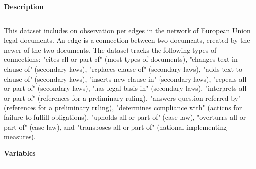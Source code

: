 \documentclass[10pt]{article}
\newcommand{\dividerline}{{\color{gray!10} \rule[4pt] {\textwidth}{3pt}}}
\newcommand{\subheading}[1]{
\vspace{24pt}
{\color{themecolor} \fontsize{14}{14}\selectfont \textbf{#1}}
\vspace{6pt}
\dividerline
\vspace{-20pt}
}
\begin{document}
\begin{flushleft}
\subheading{Description}

This dataset includes on observation per edges in the network of European Union legal documents. An edge is a connection between two documents, created by the newer of the two documents. The dataset tracks the following types of connections: "cites all or part of" (most types of documents), "changes text in clause of" (secondary laws), "replaces clause of" (secondary laws), "adds text to clause of" (secondary laws), "inserts new clause in" (secondary laws), "repeals all or part of" (secondary laws), "has legal basis in" (secondary laws), "interprets all or part of" (references for a preliminary ruling), "answers question referred by" (references for a preliminary ruling), "determines compliance with" (actions for failure to fulfill obligations), "upholds all or part of" (case law), "overturns all or part of" (case law), and "transposes all or part of" (national implementing measures). 

\subheading{Variables}


\end{flushleft}
\end{document}
